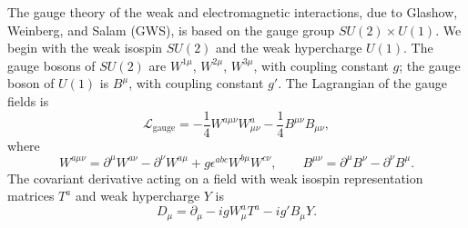 The gauge theory of the weak and electromagnetic interactions, due to Glashow,
Weinberg, and Salam (GWS), is based on the gauge group $SU(2)\times U(1)$.  We
begin with the weak isospin $SU(2)$ and the weak hypercharge $U(1)$.  The
gauge bosons of $SU(2)$ are $W^{1\mu}$, $W^{2\mu}$, $W^{3\mu}$, with coupling
constant $g$; the gauge boson of $U(1)$ is $B^\mu$, with coupling constant
$g'$.  The Lagrangian of the gauge fields is
\begin{equation}
  \mathcal{L}_{\mathrm{gauge}} = -\frac{1}{4}W^{a\mu\nu}W^a_{\mu\nu}
    - \frac{1}{4}B^{\mu\nu}B_{\mu\nu} ,
  \label{eq:20.58}
\end{equation}
where
\begin{equation}
  W^{a\mu\nu} = \partial^\mu W^{a\nu} - \partial^\nu W^{a\mu}
    + g\epsilon^{abc}W^{b\mu}W^{c\nu},\qquad
  B^{\mu\nu} = \partial^\mu B^\nu - \partial^\nu B^\mu .
\end{equation}
The covariant derivative acting on a field with weak isospin representation
matrices $T^a$ and weak hypercharge $Y$ is
\begin{equation}
  D_\mu = \partial_\mu - igW^a_\mu T^a - ig'B_\mu Y .
  \label{eq:20.65}
\end{equation}

